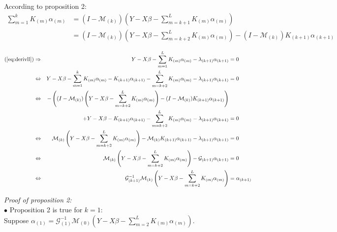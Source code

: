 \begin{changebar}[0.2cm]
According to proposition 2: \\

\begin{align*}
\sum\limits_{m = 1}^k K_{(m)} \alpha_{(m)} &=  (I - \mathcal{M}_{(k)}) \left(Y - X\beta - \sum\limits_{m = k + 1}^L K_{(m)}\alpha_{(m)} \right) \\
& = (I - \mathcal{M}_{(k)}) \left(Y - X\beta - \sum\limits_{m = k + 2}^L K_{(m)}\alpha_{(m)} \right) - (I - \mathcal{M}_{(k)}) K_{(k+1)} \alpha_{(k+1)}
\end{align*}

\begin{align*}
\text{(\ref{eq:derivll})} \Rightarrow  && Y - X\beta - \sum\limits_{m = 1}^L K_{(m)} \alpha_{(m)} - \lambda_{(k+1)} \alpha_{(k+1)}  & =  0 \\
\Leftrightarrow && Y - X\beta - \sum\limits_{m = 1}^k K_{(m)} \alpha_{(m)} - K_{(k+1)} \alpha_{(k+1)}  - \sum\limits_{m = k + 2}^L K_{(m)} \alpha_{(m)} -  \lambda_{(k+1)} \alpha_{(k+1)}   &=  0 \\
\Leftrightarrow && - \left( (I - \mathcal{M}_{(k)}) \left(Y - X\beta - \sum\limits_{m = k + 2}^L K_{(m)}\alpha_{(m)} \right) - (I - \mathcal{M}_{(k)}) K_{(k+1)} \alpha_{(k+1)} \right) & \\
&& + Y - X\beta - K_{(k+1)} \alpha_{(k+1)} - \sum\limits_{m = k + 2}^L K_{(m)} \alpha_{(m)} -  \lambda_{(k+1)} \alpha_{(k+1)}  & =  0 \\
\Leftrightarrow && \mathcal{M}_{(k)} \left( Y - X\beta - \sum\limits_{m = k + 2}^L K_{(m)} \alpha_{(m)} \right)  - \mathcal{M}_{(k)} K_{(k+1)} \alpha_{(k+1)}  -  \lambda_{(k+1)} \alpha_{(k+1)}  & =  0 \\
\Leftrightarrow && \mathcal{M}_{(k)} \left(Y - X\beta - \sum\limits_{m = k + 2}^L K_{(m)} \alpha_{(m)} \right) -  \mathcal{G}_{(k+1)} \alpha_{(k+1)}  & = 0 \\
\Leftrightarrow &&  \mathcal{G}_{(k+1)}^{-1}  \mathcal{M}_{(k)} \left(Y - X\beta - \sum\limits_{m = k + 2}^L K_{(m)} \alpha_{(m)} \right) &  =  \alpha_{(k+1)}   \\
\end{align*}


\noindent \textit{Proof of proposition 2:} \\

$\bullet$ Proposition 2 is true for $k = 1$: \\

Suppose $\alpha_{(1)} = \mathcal{G}_{(1)}^{-1}\mathcal{M}_{(0)} \left( Y - X\beta - \sum\limits_{m = 2}^L K_{(m)}\alpha_{(m)} \right)$.


\end{changebar}
